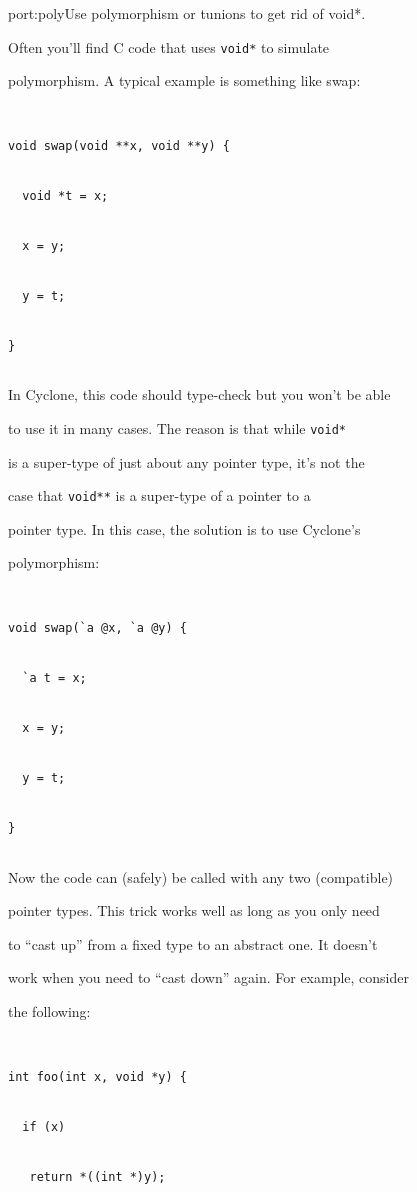 \begin{porta}{port:poly}{Use polymorphism or tunions to get rid of void*.}  


Often you'll find C code that uses \texttt{void*} to simulate


polymorphism.  A typical example is something like swap:


\begin{verbatim}


void swap(void **x, void **y) {


  void *t = x;


  x = y;


  y = t;


}


\end{verbatim}


In Cyclone, this code should type-check but you won't be able


to use it in many cases.  The reason is that while \texttt{void*}


is a super-type of just about any pointer type, it's not the


case that \texttt{void**} is a super-type of a pointer to a


pointer type.  In this case, the solution is to use Cyclone's


polymorphism:


\begin{verbatim}


void swap(`a @x, `a @y) {


  `a t = x;


  x = y;


  y = t;


}


\end{verbatim}


Now the code can (safely) be called with any two (compatible)


pointer types.  This trick works well as long as you only need


to ``cast up'' from a fixed type to an abstract one.  It doesn't


work when you need to ``cast down'' again.  For example, consider


the following:


\begin{verbatim}


int foo(int x, void *y) {


  if (x)


   return *((int *)y);



\end{verbatim}
\end{porta}
